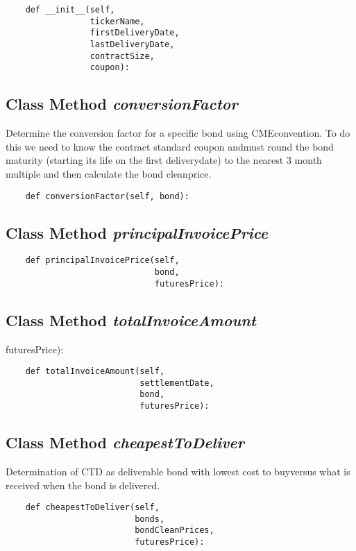 \documentclass[twoside,11pt]{book}
\begin{document}
\begin{lstlisting}
    def __init__(self,
                 tickerName,
                 firstDeliveryDate,
                 lastDeliveryDate,
                 contractSize,
                 coupon):
\end{lstlisting}

\subsection{Class Method {\it conversionFactor}}
Determine the conversion factor for a specific bond using CMEconvention. To do this we need to know the contract standard coupon andmust round the bond maturity (starting its life on the first deliverydate) to the nearest 3 month multiple and then calculate the bond cleanprice. 

\begin{lstlisting}
    def conversionFactor(self, bond):
\end{lstlisting}

\subsection{Class Method {\it principalInvoicePrice}}


\begin{lstlisting}
    def principalInvoicePrice(self,
                              bond,
                              futuresPrice):
\end{lstlisting}

\subsection{Class Method {\it totalInvoiceAmount}}
futuresPrice):

\begin{lstlisting}
    def totalInvoiceAmount(self,
                           settlementDate,
                           bond,
                           futuresPrice):
\end{lstlisting}

\subsection{Class Method {\it cheapestToDeliver}}
Determination of CTD as deliverable bond with lowest cost to buyversus what is received when the bond is delivered. 

\begin{lstlisting}
    def cheapestToDeliver(self,
                          bonds,
                          bondCleanPrices,
                          futuresPrice):
\end{lstlisting}
\end{document}
